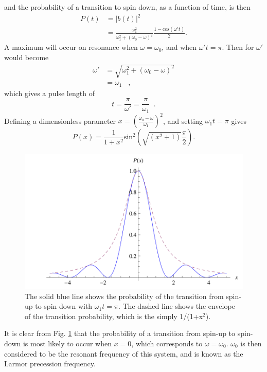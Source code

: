 %
and the probability of a transition to spin down, as a function of
time, is then
%
\begin{equation}
\begin{split}
P(t) &= |b(t)|^2 \\
&=\frac{\omega_1^2}{\omega_{1}^2 + (\omega_0 - \omega)^2}\frac{1- \textrm{cos}(\omega' t)}{2}.
\end{split}
\end{equation}
%
A maximum will occur on resonance when $\omega = \omega_0$, and when
$\omega ' t = \pi$. Then for $\omega'$ would become
%
\begin{equation}
\begin{split}
\omega' &= \sqrt{\omega_{1}^{2} + (\omega_{0}-\omega)^{2}} \\
& = \omega_{1} \;\;\; ,
\end{split}
\end{equation}
%
which gives a pulse length of
\begin{equation}
t = \frac{\pi}{\omega'} =\frac{\pi}{\omega_1} \;\; .
\end{equation}
%
Defining a dimensionless parameter $x = (\frac{\omega_0 - \omega}{\omega_1})^2$, and setting $\omega_1 t = \pi$ gives
%
\begin{equation}
P(x)=\frac{1}{1 + x^2}\textrm{sin}^{2}(\sqrt{(x^2 +1)}\frac{\pi}{2}).
\end{equation}

\begin{figure}[h!]
  \centering \includegraphics[width=1\textwidth]{NMR_Lineshape.png}
  \caption{The solid blue line shows the probability of the transition
    from spin-up to spin-down with $\omega_1 t = \pi$.  The dashed
    line shows the envelope of the transition probability, which is
    the simply 1/(1+x$^2$).}
    \label{fig:trans}
\end{figure} 
%
It is clear from Fig. \ref{fig:trans} that the probability of a
transition from spin-up to spin-down is most likely to occur when
$x=0$, which corresponds to $\omega = \omega_0$.  $\omega_0$ is then
considered to be the resonant frequency of this system, and is known
as the Larmor precession frequency.
